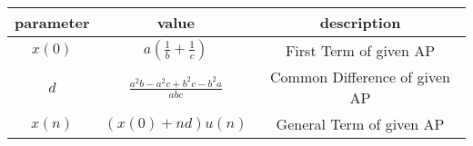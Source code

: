 
  \centering
  \begin{tabular}{|c|c|c|}
  \hline
    parameter & value & description \\
    \hline
    $x(0)$ & $a\left(\frac{1}{b} + \frac{1}{c}\right)$ & First Term of given AP \\
    \hline
    $d$ & $\frac{a^2b-a^2c+b^2c-b^2a}{abc}$ & Common Difference of given AP \\
    \hline
    $x(n)$ & $(x(0) + nd)u(n)$ & General Term of given AP \\
    \hline
  \end{tabular}

